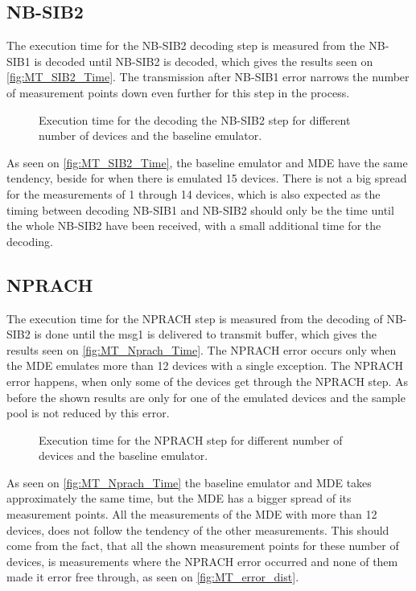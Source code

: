 \subsection{NB-SIB2}
The execution time for the NB-SIB2 decoding step is measured from the NB-SIB1 is decoded until NB-SIB2 is decoded, which gives the results seen on \autoref{fig:MT_SIB2_Time}. The transmission after NB-SIB1 error narrows the number of measurement points down even further for this step in the process.

\begin{figure}[H]
\centering

\caption{Execution time for the decoding the NB-SIB2 step for different number of devices and the baseline emulator.}
\label{fig:MT_SIB2_Time}
\end{figure}


As seen on \autoref{fig:MT_SIB2_Time}, the baseline emulator and MDE have the same tendency, beside for when there is emulated 15 devices. There is not a big spread for the measurements of 1 through 14 devices, which is also expected as the timing between decoding NB-SIB1 and NB-SIB2 should only be the time until the whole NB-SIB2 have been received, with a small additional time for the decoding. 

\subsection{NPRACH}
The execution time for the NPRACH step is measured from the decoding of NB-SIB2 is done until the msg1 is delivered to transmit buffer, which gives the results seen on \autoref{fig:MT_Nprach_Time}. The NPRACH error occurs only when the MDE emulates more than 12 devices with a single exception. The NPRACH error happens, when only some of the devices get through the NPRACH step. As before the shown results are only for one of the emulated devices and the sample pool is not reduced by this error.

\begin{figure}[H]
\centering
\resizebox{0.5\textwidth}{!}{
}
\caption{Execution time for the NPRACH step for different number of devices and the baseline emulator.}
\label{fig:MT_Nprach_Time}
\end{figure}

As seen on \autoref{fig:MT_Nprach_Time} the baseline emulator and MDE takes approximately the same time, but the MDE has a bigger spread of its measurement points. All the measurements of the MDE with more than 12 devices, does not follow the tendency of the other measurements. This should come from the fact, that all the shown measurement points for these number of devices, is measurements where the NPRACH error occurred and none of them made it error free through, as seen on \autoref{fig:MT_error_dist}.

